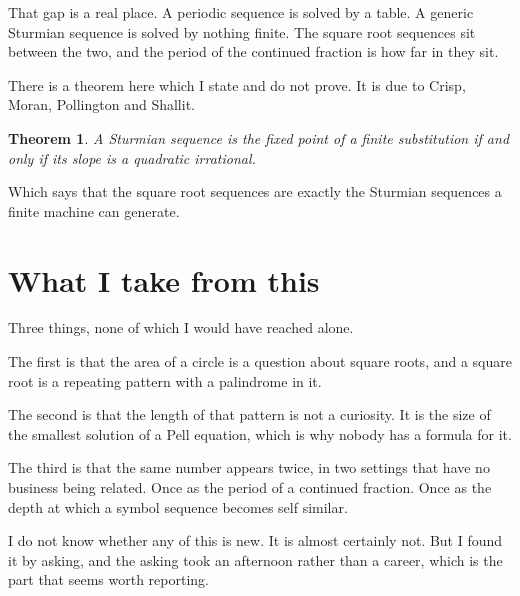 \documentclass[11pt,a4paper]{article}
\theoremstyle{definition}
\theoremstyle{plain}
\newtheorem{theorem}[definition]{Theorem}
\begin{document}
That gap is a real place. A periodic sequence is solved by a table. A generic
Sturmian sequence is solved by nothing finite. The square root sequences sit
between the two, and the period of the continued fraction is how far in they
sit.

There is a theorem here which I state and do not prove. It is due to Crisp,
Moran, Pollington and Shallit.

\begin{theorem}
A Sturmian sequence is the fixed point of a finite substitution if and only if
its slope is a quadratic irrational.
\end{theorem}

Which says that the square root sequences are exactly the Sturmian sequences a
finite machine can generate.

\section{What I take from this}

Three things, none of which I would have reached alone.

The first is that the area of a circle is a question about square roots, and a
square root is a repeating pattern with a palindrome in it.

The second is that the length of that pattern is not a curiosity. It is the size
of the smallest solution of a Pell equation, which is why nobody has a formula
for it.

The third is that the same number appears twice, in two settings that have no
business being related. Once as the period of a continued fraction. Once as the
depth at which a symbol sequence becomes self similar.

I do not know whether any of this is new. It is almost certainly not. But I
found it by asking, and the asking took an afternoon rather than a career, which
is the part that seems worth reporting.
\end{document}
